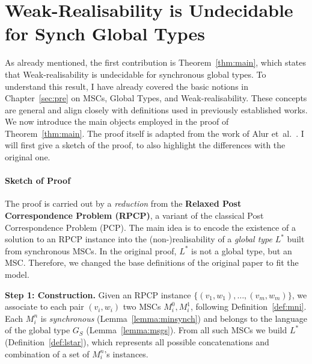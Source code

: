 \chapter{Weak-Realisability is Undecidable for Synch Global Types}\label{sec:proof}

As already mentioned, the first contribution is Theorem~\ref{thm:main},
which states that Weak-realisability is undecidable for synchronous global types. 
To understand this result, I have already covered the basic notions in 
Chapter~\ref{sec:pre} on MSCs, Global Types, and Weak-realisability. 
These concepts are general and align 
closely with definitions used in previously established works. 
We now introduce the main objects employed in the proof of Theorem~\ref{thm:main}. 
The proof itself is adapted from the work of 
Alur et~al.~\cite{alur2005realizability}. 
I will first give a sketch of the proof, to also highlight the 
differences with the original one.

\subsubsection*{Sketch of Proof}
The proof is carried out by a \emph{reduction} from the
\textbf{Relaxed Post Correspondence Problem (RPCP)}, a variant of
the classical Post Correspondence Problem (PCP).
The main idea is to encode the existence of a
solution to an RPCP instance into the (non-)realisability of a
\emph{global type} $L^*$ built from synchronous MSCs. 
In the original proof, $L^*$ is not a global type, but an MSC.
Therefore, we changed the base definitions of the original paper
to fit the model. 

\bigskip

\textbf{Step 1: Construction.}
Given an RPCP instance $\{(v_1,w_1),\ldots,(v_m,w_m)\}$,
we associate to each pair $(v_i,w_i)$ two MSCs $M^0_i,M^1_i$,
following Definition~\ref{def:mni}. Each $M^n_i$ is \emph{synchronous}
(Lemma~\ref{lemma:minsynch}) and belongs to the language of the
global type $G_S$ (Lemma~\ref{lemma:msgs}). From all such MSCs we
build $L^*$ (Definition~\ref{def:lstar}), which represents all possible
concatenations and combination of a set of $M^n_i$'s instances.

\bigskip

